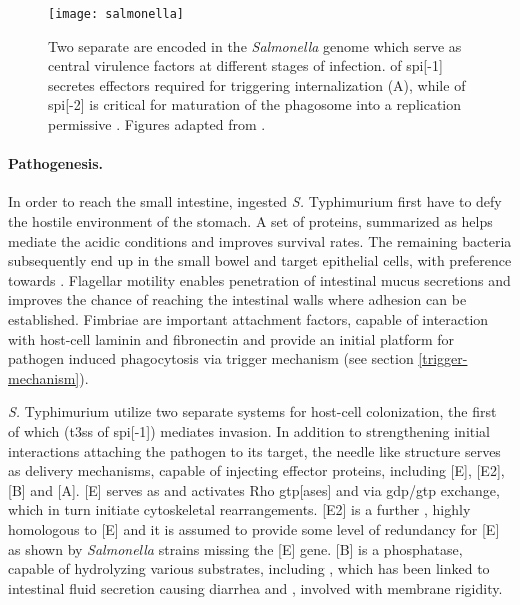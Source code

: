 \begin{figure}[t]
  \centering
  \texttt{[image: salmonella]}
  \caption[Overview of mechanisms for infection of epithelial cells by \textit{Salmonella} and establishing an intracellular replicatory niche.]{Two separate  are encoded in the \textit{Salmonella} genome which serve as central virulence factors at different stages of infection.  of \acrshort{spi}[-1] secretes effectors required for triggering internalization (A), while  of \acrshort{spi}[-2] is critical for maturation of the phagosome into a replication permissive . Figures adapted from \citet{Haraga2008}.}
  \label{fig:salmonella}
\end{figure}

\paragraph{Pathogenesis.}
In order to reach the small intestine, ingested \textit{S.} Typhimurium first have to defy the hostile environment of the stomach. A set of proteins, summarized as  helps mediate the acidic conditions and improves survival rates. The remaining bacteria subsequently end up in the small bowel and target epithelial cells, with preference towards . Flagellar motility enables penetration of intestinal mucus secretions and improves the chance of reaching the intestinal walls where adhesion can be established. Fimbriae are important attachment factors, capable of interaction with host-cell laminin and fibronectin and provide an initial platform for pathogen induced phagocytosis via trigger mechanism (see section \ref{trigger-mechanism}). 

\textit{S.} Typhimurium utilize two separate  systems for host-cell colonization, the first of which (\acrshort{t3ss} of \acrshort{spi}[-1]) mediates invasion. In addition to strengthening initial interactions attaching the pathogen to its target, the needle like structure serves as delivery mechanisms, capable of injecting effector proteins, including [E], [E2], [B] and [A]. [E] serves as  and activates Rho \acrshort{gtp}[ases]  and  via \acrshort{gdp}\slash \acrshort{gtp} exchange, which in turn initiate cytoskeletal rearrangements. [E2] is a further , highly homologous to [E] and it is assumed to provide some level of redundancy for [E] as shown by \textit{Salmonella} strains missing the [E] gene. [B] is a phosphatase, capable of hydrolyzing various substrates, including , which has been linked to intestinal fluid secretion causing diarrhea and , involved with membrane rigidity. 

